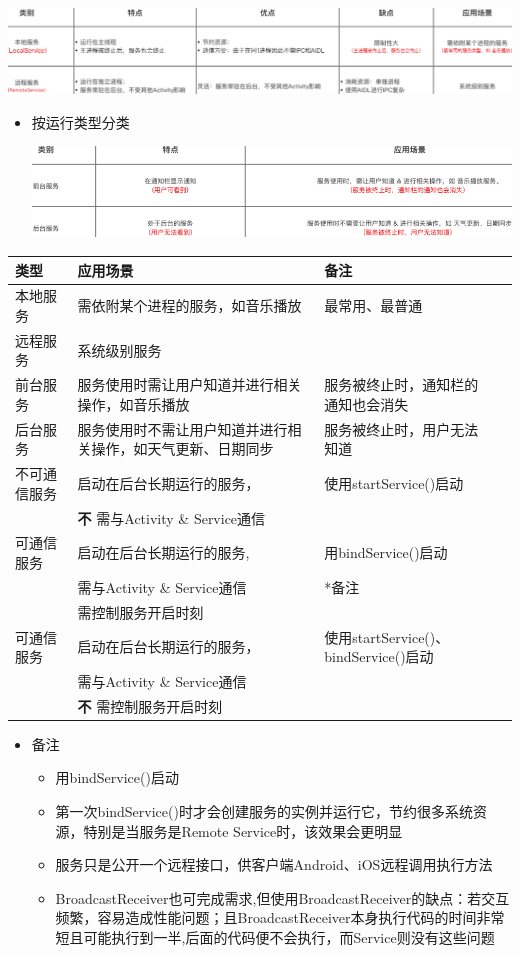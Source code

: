 \documentclass[9pt, b5paper]{article}
\begin{document}
\includegraphics[width=.9\linewidth]{./pic/location.png}
\begin{itemize}
\item 按运行类型分类

\includegraphics[width=.9\linewidth]{./pic/category.png}
\end{itemize}
\begin{center}
\begin{tabular}{llll}
\hline
类型 & 应用场景 & 备注 & \\
\hline
本地服务 & 需依附某个进程的服务，如音乐播放 & 最常用、最普通 & \\
远程服务 & 系统级别服务 &  & \\
\hline
前台服务 & 服务使用时需让用户知道并进行相关操作，如音乐播放 & 服务被终止时，通知栏的通知也会消失 & \\
后台服务 & 服务使用时不需让用户知道并进行相关操作，如天气更新、日期同步 & 服务被终止时，用户无法知道 & \\
\hline
不可通信服务 & 启动在后台长期运行的服务， & 使用startService()启动 & \\
 & \textbf{不} 需与Activity \& Service通信 &  & \\
\hline
可通信服务 & 启动在后台长期运行的服务, & 用bindService()启动 & \\
 & 需与Activity \& Service通信 & *备注 & \\
 & 需控制服务开启时刻 &  & \\
\hline
可通信服务 & 启动在后台长期运行的服务， & 使用startService()、bindService()启动 & \\
 & 需与Activity \& Service通信 &  & \\
 & \textbf{不} 需控制服务开启时刻 &  & \\
\hline
\end{tabular}
\end{center}
\begin{itemize}
\item 备注
\begin{itemize}
\item 用bindService()启动
\item 第一次bindService()时才会创建服务的实例并运行它，节约很多系统资源，特别是当服务是Remote Service时，该效果会更明显
\item 服务只是公开一个远程接口，供客户端Android、iOS远程调用执行方法
\item BroadcastReceiver也可完成需求,但使用BroadcastReceiver的缺点：若交互频繁，容易造成性能问题；且BroadcastReceiver本身执行代码的时间非常短且可能执行到一半,后面的代码便不会执行，而Service则没有这些问题
\end{itemize}
\end{itemize}
\end{document}
